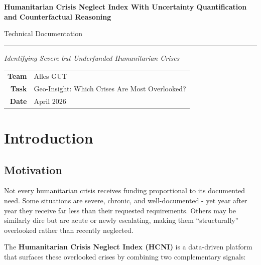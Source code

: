\documentclass[11pt,a4paper]{article}
\begin{document}
\begin{titlepage}
  \centering
  \vspace*{3cm}
  {\Huge\bfseries\color{ocha-blue} Humanitarian Crisis Neglect Index With Uncertainty Quantification and Counterfactual Reasoning\par}
  \vspace{0.5cm}
  {\Large Technical Documentation \par}
  \vspace{0.8cm}
  \rule{10cm}{0.5pt}\par
  \vspace{0.8cm}
  {\large\textit{Identifying Severe but Underfunded Humanitarian Crises} \par}
  \vspace{2cm}
  {\normalsize
    \begin{tabular}{rl}
      \textbf{Team} & Alles GUT                                      \\[4pt]
      \textbf{Task} & Geo-Insight: Which Crises Are Most Overlooked? \\[4pt]
      \textbf{Date} & April 2026                                     \\[4pt]
    \end{tabular}
    \par}
  \vfill
\end{titlepage}

\tableofcontents
\newpage

\section{Introduction}

\subsection{Motivation}

Not every humanitarian crisis receives funding proportional to its documented need.
Some situations are severe, chronic, and well-documented - yet year after year they
receive far less than their requested requirements.
Others may be similarly dire but are acute or newly escalating, making them
``structurally'' overlooked rather than recently neglected.

The \textbf{Humanitarian Crisis Neglect Index (HCNI)} is a data-driven platform that
surfaces these overlooked crises by combining two complementary signals:
\end{document}
